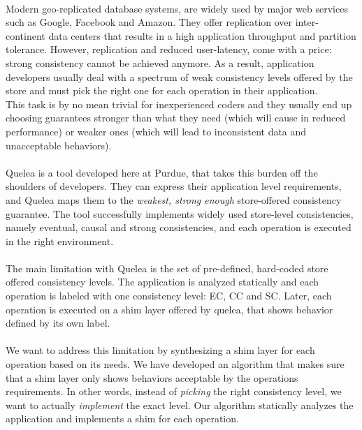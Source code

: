 \documentclass[runningheads,a4paper]{llncs}
\begin{document}
\paragraph{}
Modern geo-replicated database systems, are widely used by major web services such as Google, Facebook and Amazon. They offer replication over inter-continent data centers that results in a high application throughput and partition tolerance. However, replication and reduced user-latency, come with a price: strong consistency cannot be achieved anymore\cite{cap}. As a result, application developers usually deal  with a spectrum of weak consistency levels offered by the store and must pick the right one for each operation in their application. \\This task is by no mean trivial for inexperienced coders and they usually end up choosing guarantees stronger than what they need (which will cause in reduced performance) or weaker ones (which will lead to inconsistent data and unacceptable behaviors).
\paragraph{}
 Quelea\cite{quelea} is a tool developed here at Purdue, that takes this burden off the shoulders of developers. They can express their application level requirements, and Quelea maps them to the \emph{weakest, strong enough} store-offered consistency guarantee. The tool successfully implements widely used store-level consistencies, namely eventual, causal and strong consistencies, and each operation is executed in the right environment. 
 
\paragraph{} The main limitation with Quelea is the set of pre-defined, hard-coded store offered consistency levels. The application is analyzed statically and each operation is labeled with one consistency level: EC, CC and SC. Later, each operation is executed on a shim layer offered by quelea, that shows behavior defined by its own label. 
\paragraph{} We want to address this limitation by synthesizing a shim layer for each operation based on its needs. We have developed an algorithm that makes sure that a shim layer only shows behaviors acceptable by the operations requirements. In other words, instead of \emph{picking} the right consistency level, we want to actually \emph{implement} the exact level. Our algorithm statically analyzes the application and implements a shim for each operation. 
\end{document}
